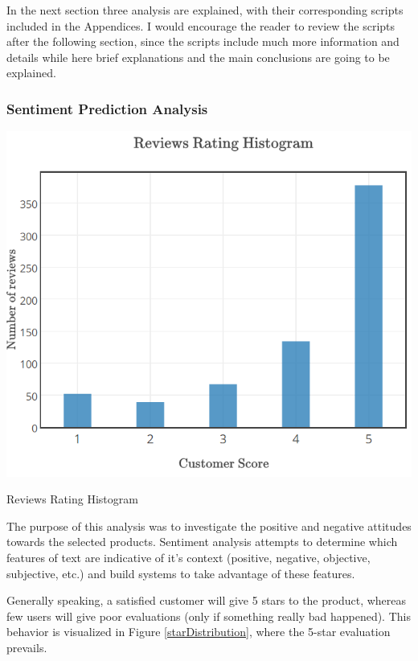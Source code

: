 In the next section three analysis are explained, with their corresponding scripts included in the Appendices. I would encourage the reader to review the scripts after the following section, since the scripts include much more information and details while here brief explanations and the main conclusions are going to be explained.

\subsubsection{\textbf{Sentiment Prediction Analysis}}

\begin{marginfigure}
	\includegraphics[width=1.3\linewidth]{figs/01/review_score}
	\caption{Reviews Rating Histogram}
	\label{starDistribution}
\end{marginfigure}

The purpose of this analysis was to investigate the positive and negative attitudes towards the selected products. Sentiment analysis attempts to determine which features of text are indicative of it's context (positive, negative, objective, subjective, etc.) and build systems to take advantage of these features.

Generally speaking, a satisfied customer will give 5 stars to the product, whereas few users will give poor evaluations (only if something really bad happened). This behavior is visualized in Figure \ref{starDistribution}, where the 5-star evaluation prevails.

